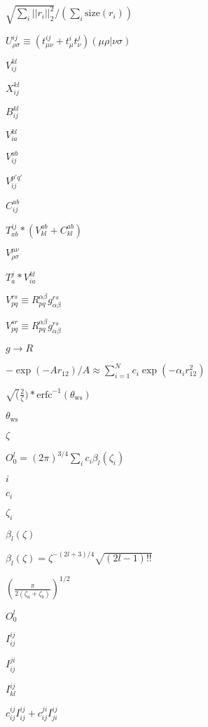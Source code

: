 \documentclass{article}
\begin{document}
$ \sqrt{\sum_i ||r_i||_2^2}/(\sum_i \mathrm{size}(r_i)) $
\pagebreak

$ U^{ij}_{\rho\sigma} \equiv \left( t^{ij}_{\mu \nu} + t^{i}_{\mu} t^{j}_{\nu} \right) (\mu \rho| \nu \sigma) $
\pagebreak

$V_{ij}^{kl}$
\pagebreak

$X_{ij}^{kl}$
\pagebreak

$B_{ij}^{kl}$
\pagebreak

$V_{ia}^{kl}$
\pagebreak

$V_{ij}^{ab}$
\pagebreak

$V_{ij}^{p'q'}$
\pagebreak

$C_{ij}^{ab}$
\pagebreak

$T_{ab}^{ij} * (V_{kl}^{ab} + C_{kl}^{ab})$
\pagebreak

$V_{\rho \sigma}^{\mu \nu}$
\pagebreak

$T_{a}^{j} * V_{ia}^{kl}$
\pagebreak

$V_{pq}^{rs} \equiv R_{pq}^{\alpha \beta} g_{\alpha \beta}^{r s}$
\pagebreak

$V_{pq}^{sr} \equiv R_{pq}^{\alpha \beta} g_{\alpha \beta}^{r s}$
\pagebreak

$ g \to R $
\pagebreak

$ - \exp(- A r_{12})/A \approx \sum\limits_{i=1}^N c_i \exp(- \alpha_i r_{12}^2) $
\pagebreak

$ \sqrt(\frac{2}{\zeta}) * \mathrm{erfc}^{-1}(\theta_\mathrm{ws}) $
\pagebreak

$ \theta_\mathrm{ws} $
\pagebreak

$ \zeta $
\pagebreak

$ O^l_0 = (2 \pi)^{3/4} \sum_i c_i \beta_l(\zeta_i) $
\pagebreak

$ i $
\pagebreak

$ c_i $
\pagebreak

$ \zeta_i $
\pagebreak

$ \beta_l(\zeta) $
\pagebreak

$ \beta_l(\zeta) = \zeta^{-(2l+3)/4} \sqrt{(2l-1)!!} $
\pagebreak

$ \left(\frac{\pi}{2(\zeta_a+\zeta_b)}\right)^{1/2} $
\pagebreak

$ O^l_0 $
\pagebreak

$ I^{ij}_{ij} $
\pagebreak

$ I^{ji}_{ij} $
\pagebreak

$ I^{ij}_{kl} $
\pagebreak

$ c^{ij}_{ij} I^{ij}_{ij} + c^{ji}_{ij} I^{ij}_{ji} $
\pagebreak
\end{document}
